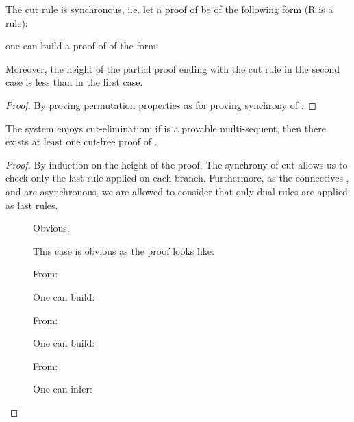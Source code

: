 \documentclass{llncs}
\begin{document}
\begin{lemma}
The cut rule is synchronous, i.e. let a proof of  be of the following form (R is a rule):

one can build a proof of  of the form:

Moreover, the height of the partial proof ending with the cut rule in the second case is less than in the first case.
\end{lemma}

\begin{proof}
By proving permutation properties as for proving synchrony of .
\end{proof}





\begin{proposition}
The system enjoys cut-elimination: if  is a provable multi-sequent, 
then there exists at least one cut-free proof of .
\end{proposition}

\begin{proof} By induction on the height of the proof. The synchrony of cut 
allows us to check only the last rule applied on each branch. Furthermore,
as the connectives ,  and  are asynchronous, we are
allowed to consider that only dual rules are applied as last rules.
\begin{description}
\item[] Obvious.
\item[ ] This case is obvious as the proof looks like:

\item[ ] From:

One can build:

\item[ ] From:

One can build:

\item[] From:
     
     One can infer:
     
\end{description}
\end{proof}
 
\end{document}

